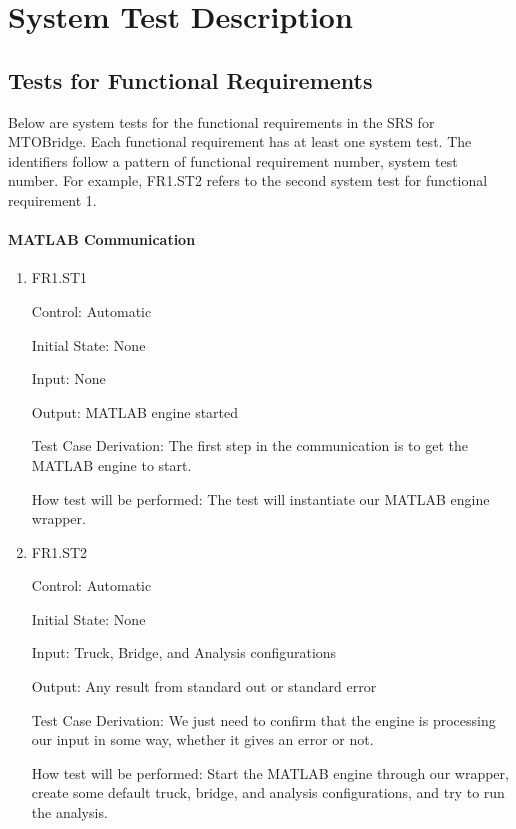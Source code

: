 \documentclass[12pt, titlepage]{article}
\begin{document}
\section{System Test Description}
	
\subsection{Tests for Functional Requirements}

Below are system tests for the functional requirements in the SRS for MTOBridge.
Each functional requirement has at least one system test. The identifiers follow a pattern of
functional requirement number, system test number. For example, FR1.ST2 refers to the second
system test for functional requirement 1.
		
\paragraph{MATLAB Communication}

\begin{enumerate}

  \item{FR1.ST1\\}

  Control: Automatic

  Initial State: None

  Input: None

  Output: MATLAB engine started

  Test Case Derivation: The first step in the communication is to get the MATLAB engine
  to start.

  How test will be performed: The test will instantiate our MATLAB engine wrapper.

  \item{FR1.ST2\\}

  Control: Automatic

  Initial State: None

  Input: Truck, Bridge, and Analysis configurations

  Output: Any result from standard out or standard error

  Test Case Derivation: We just need to confirm that the engine is processing our
  input in some way, whether it gives an error or not.

  How test will be performed: Start the MATLAB engine through our wrapper, create
  some default truck, bridge, and analysis configurations, and try to run the analysis.

\end{enumerate}
\end{document}
